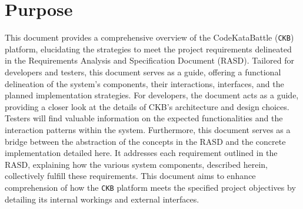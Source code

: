 \section{Purpose}
\label{sec:purpose}
This document provides a comprehensive overview of the CodeKataBattle (\verb|CKB|) platform, elucidating the strategies to meet the project requirements delineated in the Requirements Analysis and Specification Document (RASD). 
Tailored for developers and testers, this document serves as a guide, offering a functional delineation of the system's components, their interactions, interfaces, and the planned implementation strategies.
For developers, the document acts as a guide, providing a closer look at the details of CKB's architecture and design choices.
Testers will find valuable information on the expected functionalities and the interaction patterns within the system.
Furthermore, this document serves as a bridge between the abstraction of the concepts in the RASD and the concrete implementation detailed here. 
It addresses each requirement outlined in the RASD, explaining how the various system components, described herein, collectively fulfill these requirements. 
This document aims to enhance comprehension of how the \verb|CKB| platform meets the specified project objectives by detailing its internal workings and external interfaces.

